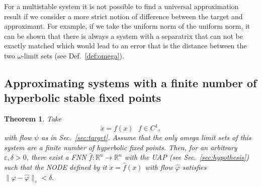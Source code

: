 \documentclass{article}
\newtheorem{theorem}{Theorem}
\theoremstyle{definition} \newtheorem{definition}{Definition}
\theoremstyle{remark} \newtheorem{remark}{Remark}
\newcommand{\reals}{\mathbb{R}}
\newcounter{ct}
\begin{document}
For a multistable system it is not possible to find a universal approximation result if we consider a more strict notion of difference between the target and approximant.
For example, if we take the uniform norm of the uniform norm, it can be shown that there is always a system with a separatrix that can not be exactly matched which would lead to an error that is the distance between the two $\omega$-limit sets (see Def.~\ref{def:omega}).





\subsection{Approximating systems with a finite number of hyperbolic stable fixed points}\label{sec:fp_theorem}

\begin{theorem}\label{thrm:approx}
Take 
\begin{equation}\label{eq:mlp_vf}
\dot x = f(x)   \ \ \ f\in C^1,
\end{equation}
with flow $\psi$ as in Sec.~\ref{sec:target}. Assume that the only omega limit sets of this system are a finite number of hyperbolic fixed points.
%
Then, for an arbitrary $\varepsilon, \delta > 0$, there exist a FNN $\hat f: \reals^n\rightarrow\reals^n$ with the UAP (see Sec.~\ref{sec:hypothesis}) such that the NODE defined by it $\dot x = \hat f(x)$ %
with flow $\hat \varphi$ satisfies $\|\varphi-\hat \varphi\|_\varepsilon < \delta.$
\end{theorem}
\end{document}
